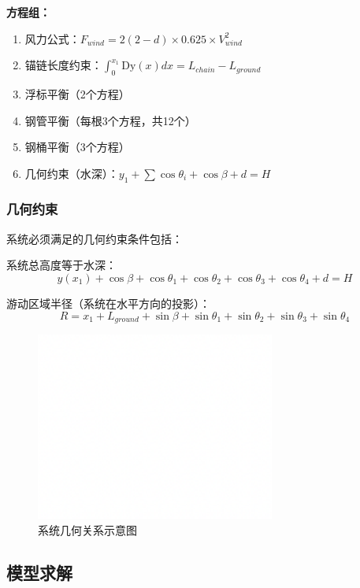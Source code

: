\documentclass[withoutpreface,bwprint]{cumcmthesis}
\begin{document}
\textbf{方程组：}
\begin{enumerate}
\item 风力公式：$F_{wind} = 2(2-d) \times 0.625 \times V_{wind}^2$
\item 锚链长度约束：$\int_0^{x_1} \text{Dy}(x) dx = L_{chain} - L_{ground}$
\item 浮标平衡（2个方程）
\item 钢管平衡（每根3个方程，共12个）
\item 钢桶平衡（3个方程）
\item 几何约束（水深）：$y_1 + \sum \cos\theta_i + \cos\beta + d = H$
\end{enumerate}

\subsubsection{几何约束}

系统必须满足的几何约束条件包括：

系统总高度等于水深：
\begin{equation}
\label{eq:几何约束详细}
y(x_1) + \cos\beta + \cos\theta_1 + \cos\theta_2 + \cos\theta_3 + \cos\theta_4 + d = H
\end{equation}

游动区域半径（系统在水平方向的投影）：
\begin{equation}
\label{eq:游动半径详细}
R = x_1 + L_{ground} + \sin\beta + \sin\theta_1 + \sin\theta_2 + \sin\theta_3 + \sin\theta_4
\end{equation}

\begin{figure}[H]
\centering
\includegraphics[width=0.7\textwidth]{figures/测试图片.png}
\caption{系统几何关系示意图}
\label{fig:几何关系}
\end{figure}

\subsection{模型求解}
\end{document}
